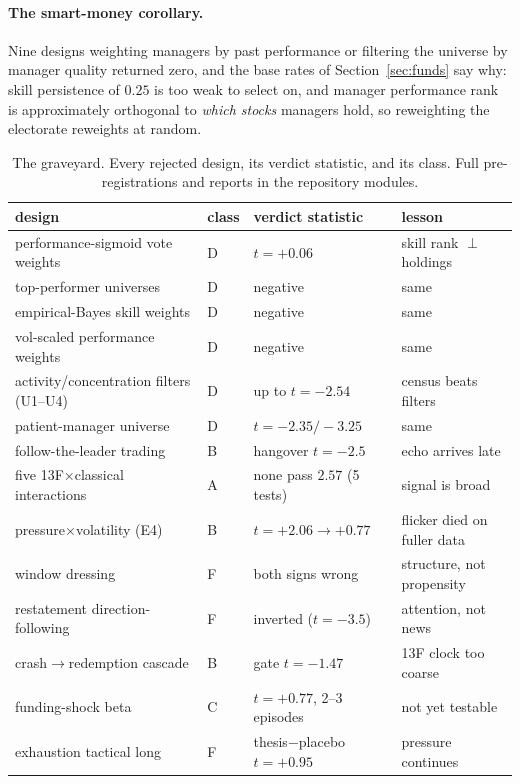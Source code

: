 \paragraph{The smart-money corollary.} Nine designs weighting
managers by past performance or filtering the universe by manager
quality returned zero, and the base rates of
Section~\ref{sec:funds} say why: skill persistence of $0.25$ is too
weak to select on, and manager performance rank is approximately
orthogonal to \emph{which stocks} managers hold, so reweighting the
electorate reweights at random.

\begin{table}[t]
\centering\scriptsize
\caption{The graveyard. Every rejected design, its verdict statistic,
and its class. Full pre-registrations and reports in the repository
modules.}
\label{tab:graveyard}
\begin{tabular}{llll}
\toprule
design & class & verdict statistic & lesson \\
\midrule
performance-sigmoid vote weights & D & $t=+0.06$ & skill rank $\perp$ holdings \\
top-performer universes & D & negative & same \\
empirical-Bayes skill weights & D & negative & same \\
vol-scaled performance weights & D & negative & same \\
activity/concentration filters (U1--U4) & D & up to $t=-2.54$ & census beats filters \\
patient-manager universe & D & $t=-2.35/-3.25$ & same \\
follow-the-leader trading & B & hangover $t=-2.5$ & echo arrives late \\
five 13F$\times$classical interactions & A & none pass $2.57$ (5 tests) & signal is broad \\
pressure$\times$volatility (E4) & B & $t=+2.06\to+0.77$ & flicker died on fuller data \\
window dressing & F & both signs wrong & structure, not propensity \\
restatement direction-following & F & inverted ($t=-3.5$) & attention, not news \\
crash$\to$redemption cascade & B & gate $t=-1.47$ & 13F clock too coarse \\
funding-shock beta & C & $t=+0.77$, 2--3 episodes & not yet testable \\
exhaustion tactical long & F & thesis$-$placebo $t=+0.95$ & pressure continues \\

\end{tabular}
\end{table}
